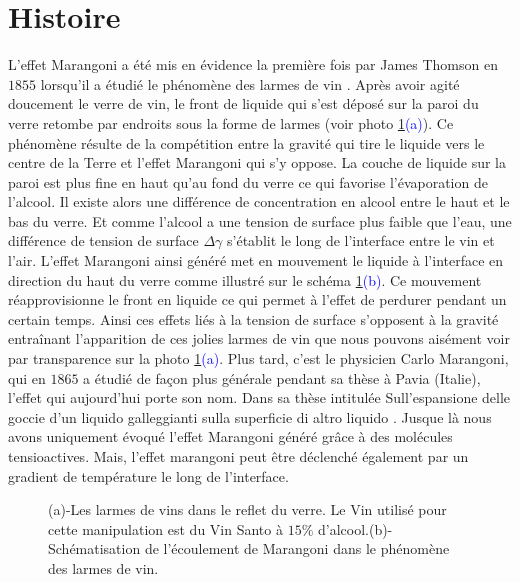   \section{Histoire}
    L'effet Marangoni a été mis en évidence la première fois par James Thomson en $1855$ lorsqu'il a étudié le phénomène des larmes de vin \cite{Thomson1855}. Après avoir agité doucement le verre de vin, le front de liquide qui s'est déposé sur la paroi du verre retombe par endroits sous la forme de larmes (voir photo \ref{fig:TearsOfWine}\textcolor{blue}{(a)}). Ce phénomène résulte de la compétition entre la gravité qui tire le liquide vers le centre de la Terre et l'effet Marangoni qui s'y oppose. La couche de liquide sur la paroi est plus fine en haut qu'au fond du verre ce qui favorise l'évaporation de l'alcool. Il existe alors une différence de concentration en alcool entre le haut et le bas du verre. Et comme l'alcool a une tension de surface plus faible que l'eau, une différence de tension de surface $\Delta\gamma$ s'établit le long de l'interface entre le vin et l'air. L'effet Marangoni ainsi généré met en mouvement le liquide à l'interface en direction du haut du verre comme illustré sur le schéma \ref{fig:TearsOfWine}\textcolor{blue}{(b)}. Ce mouvement réapprovisionne le front en liquide ce qui permet à l'effet de perdurer pendant un certain temps. Ainsi ces effets liés à la tension de surface s'opposent à la gravité entraînant l'apparition de ces jolies larmes de vin que nous pouvons aisément voir par transparence sur la photo \ref{fig:TearsOfWine}\textcolor{blue}{(a)}. Plus tard, c'est le physicien Carlo Marangoni, qui en $1865$ a étudié de façon plus générale pendant sa thèse à Pavia (Italie), l'effet qui aujourd'hui porte son nom. Dans sa thèse intitulée \og Sull'espansione delle goccie d'un liquido galleggianti sulla superficie di altro liquido \fg \cite{Marangoni1865}. Jusque là nous avons uniquement évoqué l'effet Marangoni généré grâce à des molécules tensioactives. Mais, l'effet marangoni peut être déclenché également par un gradient de température le long de l'interface.
    \begin{figure}[!ht]
      \centering
      
      \caption{(a)-Les larmes de vins dans le reflet du verre. Le Vin utilisé pour cette manipulation est du Vin Santo à $15\%$ d'alcool.(b)- Schématisation de l'écoulement de Marangoni dans le phénomène des larmes de vin.}
      \label{fig:TearsOfWine}
    \end{figure}




